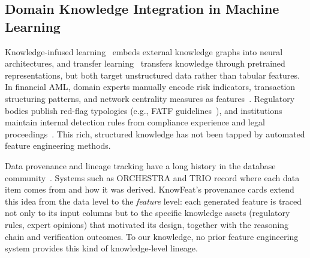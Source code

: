 \subsection{Domain Knowledge Integration in Machine Learning}

Knowledge-infused learning~\cite{kursuncu2020knowledge} embeds external knowledge graphs into neural architectures, and transfer learning~\cite{weiss2016survey} transfers knowledge through pretrained representations, but both target unstructured data rather than tabular features. In financial AML, domain experts manually encode risk indicators, transaction structuring patterns, and network centrality measures as features~\cite{chen2018aml}. Regulatory bodies publish red-flag typologies (e.g., FATF guidelines~\cite{fatf2012recommendations}), and institutions maintain internal detection rules from compliance experience and legal proceedings~\cite{weber2019anti}. This rich, structured knowledge has not been tapped by automated feature engineering methods.

Data provenance and lineage tracking have a long history in the database community~\cite{buneman2001and,cheney2009provenance}. Systems such as ORCHESTRA and TRIO record where each data item comes from and how it was derived. KnowFeat's provenance cards extend this idea from the data level to the \emph{feature} level: each generated feature is traced not only to its input columns but to the specific knowledge assets (regulatory rules, expert opinions) that motivated its design, together with the reasoning chain and verification outcomes. To our knowledge, no prior feature engineering system provides this kind of knowledge-level lineage.

